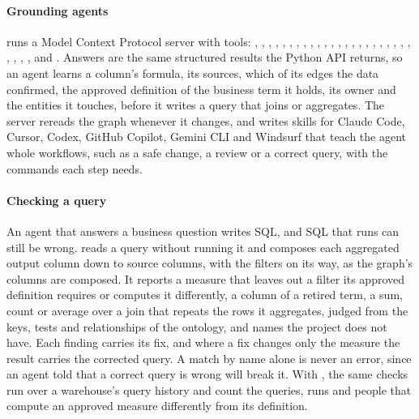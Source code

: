 \paragraph{Grounding agents}  runs a Model Context Protocol server with
\mcpTools{} tools: , , , , ,
, , , , , ,
, , , , , , , , , , , ,
, , , ,  and . Answers are the same structured results the Python API returns, so an
agent learns a column's formula, its sources, which of its edges the data confirmed, the approved
definition of the business term it holds, its owner and the entities it touches, before it writes
a query that joins or aggregates. The server rereads the graph whenever it changes, and
 writes skills for Claude Code, Cursor, Codex, GitHub Copilot, Gemini CLI and
Windsurf that teach the agent whole workflows, such as a safe change, a review or a correct query,
with the commands each step needs.

\paragraph{Checking a query} An agent that answers a business question writes SQL, and SQL that
runs can still be wrong.  reads a query without running it and composes
each aggregated output column down to source columns, with the filters on its way, as the graph's
columns are composed. It reports a measure that leaves out a filter its approved definition
requires or computes it differently, a column of a retired term, a sum, count or average over a
join that repeats the rows it aggregates, judged from the keys, tests and relationships of the
ontology, and names the project does not have. Each finding carries its fix, and where a fix
changes only the measure the result carries the corrected query. A match by name alone is never
an error, since an agent told that a correct query is wrong will break it. With
, the same checks run over a warehouse's query history and count the queries,
runs and people that compute an approved measure differently from its definition.

